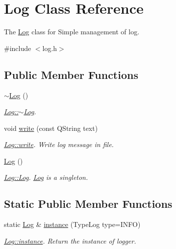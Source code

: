 \hypertarget{classLog}{\section{Log Class Reference}
\label{classLog}
}


The \hyperlink{classLog}{Log} class for Simple management of log.  




{\ttfamily \#include $<$log.\+h$>$}

\subsection*{Public Member Functions}
\begin{DoxyCompactItemize}
\item 
\hypertarget{classLog_a0fbfda88fbee5027c89f6eb121059360}{\hyperlink{classLog_a0fbfda88fbee5027c89f6eb121059360}{$\sim$\+Log} ()}\label{classLog_a0fbfda88fbee5027c89f6eb121059360}

\begin{DoxyCompactList}\small\item\em \hyperlink{classLog_a0fbfda88fbee5027c89f6eb121059360}{Log\+::$\sim$\+Log}. \end{DoxyCompactList}\item 
void \hyperlink{classLog_acef079f691840d7afd2ed9482d5d66ea}{write} (const Q\+String text)
\begin{DoxyCompactList}\small\item\em \hyperlink{classLog_acef079f691840d7afd2ed9482d5d66ea}{Log\+::write}. Write log message in file. \end{DoxyCompactList}\item 
\hypertarget{classLog_af6071a60aa52b6c1b511f99b4bc1b8fe}{\hyperlink{classLog_af6071a60aa52b6c1b511f99b4bc1b8fe}{Log} ()}\label{classLog_af6071a60aa52b6c1b511f99b4bc1b8fe}

\begin{DoxyCompactList}\small\item\em \hyperlink{classLog_af6071a60aa52b6c1b511f99b4bc1b8fe}{Log\+::\+Log}. \hyperlink{classLog}{Log} is a singleton. \end{DoxyCompactList}\end{DoxyCompactItemize}
\subsection*{Static Public Member Functions}
\begin{DoxyCompactItemize}
\item 
static \hyperlink{classLog}{Log} \& \hyperlink{classLog_ad8ef93302c147f832ed8202a6b039eb5}{instance} (Type\+Log type=I\+N\+F\+O)
\begin{DoxyCompactList}\small\item\em \hyperlink{classLog_ad8ef93302c147f832ed8202a6b039eb5}{Log\+::instance}. Return the instance of logger. \end{DoxyCompactList}\end{DoxyCompactItemize}
